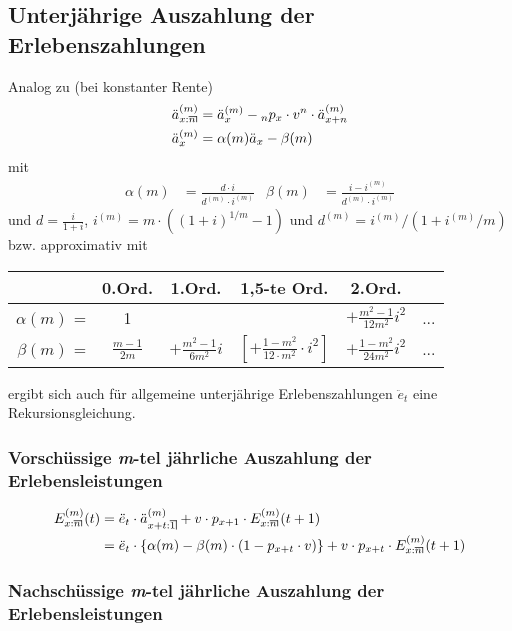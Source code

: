 \documentclass[a4paper,10pt]{article}
\makeatletter
\newcommand{\xn}{{\act[x]{n}}}
\DeclareRobustCommand{\act}[2][]{%
\def\arraystretch{0}%
\setlength\arraycolsep{0.5pt}%
\setlength\arrayrulewidth{0.5pt}%
\setbox0=\hbox{$\scriptstyle#1\ifx#1\empty{asdf}\else:\fi#2$}%
\begin{array}[b]{*2{@{}>{\scriptstyle}c}|}
\cline{2-2}%
\rule[1.25pt]{0pt}{\ht0}%
#1\ifx#1\empty\else:\fi & #2%
\end{array}%
}
\makeatother
\begin{document}
\subsection{Unterjährige Auszahlung der Erlebenszahlungen}

Analog zu (bei konstanter Rente)
\begin{align*}
 \ddot{a}^{(m)}_\xn &= \ddot{a}_x^{(m)} - {}_np_x \cdot v^n \cdot \ddot{a}_{x+n}^{(m)}\\
 \ddot{a}_x^{(m)} &= \alpha(m) \ddot{a}_x - \beta(m)
\end{align*}
mit
\begin{align*}
 \alpha(m)&= \frac{d \cdot i}{d^{(m)} \cdot i^{(m)}} & \beta(m) &= \frac{i-i^{(m)}}{d^{(m)} \cdot i^{(m)}}
\end{align*}
und $d = \frac{i}{1+i}$, $i^{(m)} = m \cdot \left((1+i)^{1/m} -1\right)$ und $d^{(m)} = i^{(m)} / \left(1+i^{(m)}/m\right)$ bzw. approximativ mit
\begin{center}
\begin{tabular}{rccccc}
& 0.Ord. & 1.Ord. & 1,5-te Ord. & 2.Ord. & \\\hline
$\alpha(m)$ = & 1 &  & & $+\frac{m^2-1}{12 m^2} i^2$ & ...\\
$\beta(m)$ = & $\frac{m-1}{2m}$ & $+ \frac{m^2-1}{6 m^2}i$ & $\left[+ \frac{1-m^2}{12\cdot m^2}\cdot i^2\right]$ &$+ \frac{1-m^2}{24 m^2}i^2$ & ...\\[0.3em]\hline
\end{tabular}
\end{center}

ergibt sich auch für allgemeine unterjährige Erlebenszahlungen $\ddot{e}_t$ eine Rekursionsgleichung.

\subsubsection{Vorschüssige \textit{m}-tel jährliche Auszahlung der Erlebensleistungen}


\begin{align*}
E^{(m)}_\xn(t) &= \ddot{e}_t \cdot \ddot{a}_{\act[x+t]{1}}^{(m)} + v \cdot p_{x+1} \cdot E^{(m)}_\xn(t+1)\\
  &= \ddot{e}_t \cdot \left\{\alpha(m)  - \beta(m) \cdot \left(1-p_{x+t} \cdot v\right)\right\} + v\cdot p_{x+t} \cdot E^{(m)}_\xn(t+1)
\end{align*}


\subsubsection{Nachschüssige \textit{m}-tel jährliche Auszahlung der Erlebensleistungen}
\end{document}
